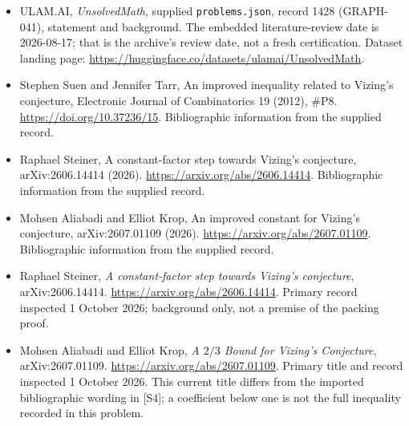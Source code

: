 \documentclass[11pt,a4paper]{article}
\begin{document}
{\small

\begin{itemize}

\item[\hypertarget{source:1428:1}{S1}] ULAM.AI, \emph{UnsolvedMath}, supplied \texttt{problems.json}, record 1428 (GRAPH-041), statement and background. The embedded literature-review date is 2026-08-17; that is the archive’s review date, not a fresh certification. Dataset landing page: \url{https://huggingface.co/datasets/ulamai/UnsolvedMath}.

\item[\hypertarget{source:1428:2}{S2}] Stephen Suen and Jennifer Tarr, An improved inequality related to Vizing's conjecture, Electronic Journal of Combinatorics 19 (2012), \#P8. \url{https://doi.org/10.37236/15}. Bibliographic information from the supplied record.

\item[\hypertarget{source:1428:3}{S3}] Raphael Steiner, A constant-factor step towards Vizing's conjecture, arXiv:2606.14414 (2026). \url{https://arxiv.org/abs/2606.14414}. Bibliographic information from the supplied record.

\item[\hypertarget{source:1428:4}{S4}] Mohsen Aliabadi and Elliot Krop, An improved constant for Vizing's conjecture, arXiv:2607.01109 (2026). \url{https://arxiv.org/abs/2607.01109}. Bibliographic information from the supplied record.


\item[E1] Raphael Steiner, \emph{A constant-factor
step towards Vizing's conjecture}, arXiv:2606.14414.
\url{https://arxiv.org/abs/2606.14414}. Primary record inspected
1 October 2026; background only, not a premise of the packing proof.
\item[E2] Mohsen Aliabadi and Elliot Krop, \emph{A $2/3$ Bound for
Vizing's Conjecture}, arXiv:2607.01109.
\url{https://arxiv.org/abs/2607.01109}. Primary title and record
inspected 1 October 2026. This current title differs from the imported
bibliographic wording in [S4]; a coefficient below one is not the
full inequality recorded in this problem.

\end{itemize}

}

\label{end:1428}
\end{document}
